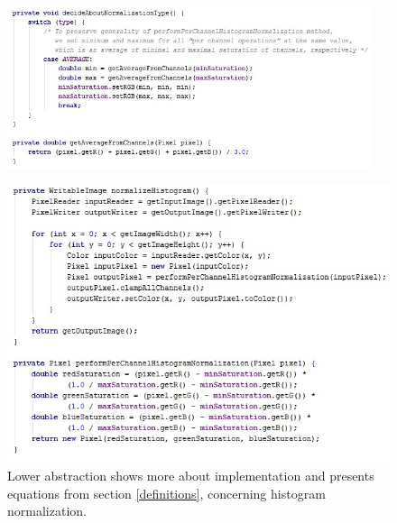 \documentclass{article}
\begin{document}
\begin{figure}[H]
	\centering
	\includegraphics[width=0.95\textwidth]{_Figures/normalization_type.jpg}
\end{figure}

\begin{figure}[H]
	\centering
	\includegraphics[width=1\textwidth]{_Figures/normalization_process.jpg}
	\caption{Lower abstraction shows more about implementation and presents equations from section \ref{definitions}, concerning histogram normalization.}
\end{figure}

%
%
\end{document}
